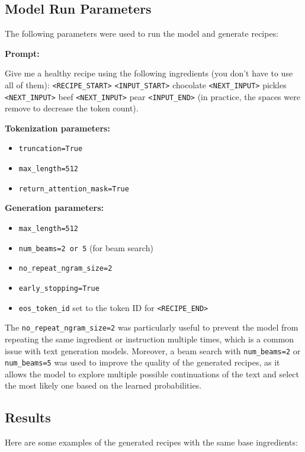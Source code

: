 \subsection{Model Run Parameters}

The following parameters were used to run the model and generate recipes:

\textbf{Prompt:}

Give me a healthy recipe using the following ingredients (you don't have to use all of them): \texttt{<RECIPE\_START>} \texttt{<INPUT\_START>} chocolate \texttt{<NEXT\_INPUT>} pickles \texttt{<NEXT\_INPUT>} beef \texttt{<NEXT\_INPUT>} pear \texttt{<INPUT\_END>} (in practice, the spaces were remove to decrease the token count).

\textbf{Tokenization parameters:}
\begin{itemize}
	\item \texttt{truncation=True}
	\item \texttt{max\_length=512}
	\item \texttt{return\_attention\_mask=True}
\end{itemize}

\textbf{Generation parameters:}
\begin{itemize}
	\item \texttt{max\_length=512}
	\item \texttt{num\_beams=2 or 5}  (for beam search)
	\item \texttt{no\_repeat\_ngram\_size=2}
	\item \texttt{early\_stopping=True}
	\item \texttt{eos\_token\_id} set to the token ID for \texttt{<RECIPE\_END>}
\end{itemize}

The \texttt{no\_repeat\_ngram\_size=2} was particularly useful to prevent the model from repeating the same ingredient or instruction multiple times, which is a common issue with text generation models. Moreover, a beam search with \texttt{num\_beams=2} or \texttt{num\_beams=5} was used to improve the quality of the generated recipes, as it allows the model to explore multiple possible continuations of the text and select the most likely one based on the learned probabilities.

\subsection{Results}

Here are some examples of the generated recipes with the same base ingredients:

